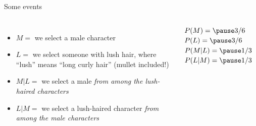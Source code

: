 \documentclass{beamer}\usepackage[]{graphicx}\usepackage[]{color}
\begin{document}
\begin{darkframes}
\begin{frame}{Some events}
\begin{columns}[onlytextwidth]
          \begin{itemize}[<+->]
            \item $M = $ we select a male character
            \item $L = $ we select someone with lush hair, where ``lush'' means ``long curly hair'' (mullet included!)
            \item $M|L = $ we select a male \emph{from among the lush-haired characters}
            \item $L|M = $ we select a lush-haired character \emph{from among the male characters}
          \end{itemize}
          \pause
          $P(M) = \pause 3/6$ \qquad $P(L) = \pause 3/6$ \\
          $P(M|L) = \pause 1/3$ \qquad $P(L|M) = \pause 1/3$ \\
      \end{columns}

    \end{frame}


\end{darkframes}
\end{document}
